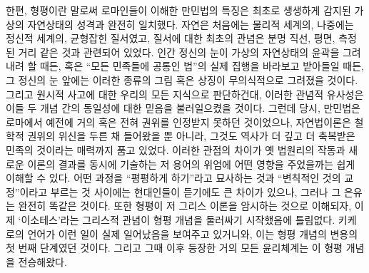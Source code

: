한편, 형평이란 말로써 로마인들이 이해한 만민법의 특징은
최초로 생생하게 감지된 가상의 자연상태의 성격과 완전히 일치했다.
자연은 처음에는 물리적 세계의, 나중에는 정신적 세계의, 균형잡힌 질서였고,
질서에 대한 최초의 관념은 분명 직선, 평면, 측정된 거리 같은 것과
관련되어 있었다.
인간 정신의 눈이 가상의 자연상태의 윤곽을 그려내려 할 때든,
혹은 ``모든 민족들에 공통인 법''의 실제 집행을 바라보고 받아들일 때든,
그 정신의 눈 앞에는 이러한 종류의 그림 혹은 상징이 무의식적으로 그려졌을 것이다.
그리고 원시적 사고에 대한 우리의 모든 지식으로 판단하건대,
이러한 관념적 유사성은 이들 두 개념 간의 동일성에 대한 믿음을
불러일으켰을 것이다.
그런데 당시,
만민법은 로마에서 예전에 거의 혹은 전혀 권위를 인정받지 못하던 것이었으나,
자연법이론은 철학적 권위의 위신을 두른 채 들어왔을 뿐 아니라,
그것도 역사가 더 깊고 더 축복받은 민족의 것이라는 매력까지 품고 있었다.
이러한 관점의 차이가
옛 법원리의 작동과 새로운 이론의 결과를 동시에 기술하는 저 용어의 위엄에
어떤 영향을 주었을까는 쉽게 이해할 수 있다.
어떤 과정을 ``평평하게 하기''라고 묘사하는 것과
``변칙적인 것의 교정''이라고 부르는 것 사이에는
현대인들이 듣기에도 큰 차이가 있으나, 그러나
그 은유는 완전히 똑같은 것이다.
또한 형평이 저 그리스 이론을 암시하는 것으로 이해되자,
이제 `이소테스'라는 그리스적 관념이 형평 개념을 둘러싸기 시작했음에 틀림없다.
키케로의 언어가 이런 일이 실제 일어났음을 보여주고 있거니와,
이는 형평 개념의 변용의 첫 번째 단계였던 것이다.
그리고 그때 이후 등장한 거의 모든 윤리체계는 이 형평 개념을 전승해왔다.


